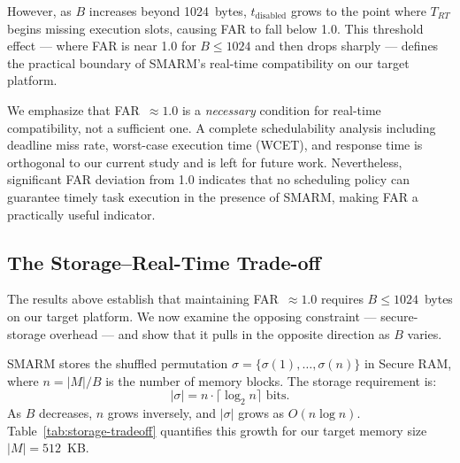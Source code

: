 \documentclass[a4paper,10pt]{article}
\begin{document}
{However, as $B$ increases beyond 1024~bytes, $t_{\mathrm{disabled}}$ 
grows to the point where $T_{RT}$ begins missing execution slots, causing 
FAR to fall below 1.0. This threshold effect — where FAR is near 1.0 for 
$B \leq 1024$ and then drops sharply — defines the practical boundary of 
SMARM's real-time compatibility on our target platform.

We emphasize that FAR~$\approx 1.0$ is a \textit{necessary} condition for 
real-time compatibility, not a sufficient one. A complete schedulability 
analysis including deadline miss rate, worst-case execution time (WCET), 
and response time is orthogonal to our current study and is left for future 
work. Nevertheless, significant FAR deviation from 1.0 indicates that no 
scheduling policy can guarantee timely task execution in the presence of 
SMARM, making FAR a practically useful indicator.


\subsection{The Storage--Real-Time Trade-off}
\label{sec:storage-tension}

The results above establish that maintaining FAR~$\approx 1.0$ 
requires $B \leq 1024$~bytes on our target platform. We now examine the
opposing constraint --- secure-storage overhead --- and show that it
pulls in the opposite direction as $B$ varies.

SMARM stores the shuffled permutation
$\sigma = \{\sigma(1), \ldots, \sigma(n)\}$ in Secure RAM, where
$n = |M| / B$ is the number of memory blocks. The storage requirement is:
\begin{equation}
    |\sigma| = n \cdot \lceil \log_2 n \rceil \text{ bits}.
    \label{eq:storage}
\end{equation}
As $B$ decreases, $n$ grows inversely, and $|\sigma|$ grows as
$O(n \log n)$. Table~\ref{tab:storage-tradeoff} quantifies this growth
for our target memory size $|M| = 512$~KB.

}
\end{document}
